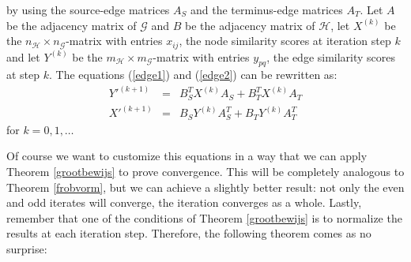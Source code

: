 \documentclass[a4paper,11pt]{report}
\newcommand{\graf}{\mathscr{G}}
\newcommand{\grafeen}{\mathscr{H}}
\begin{document}
by using the source-edge matrices $A_S$ and the terminus-edge matrices $A_T$. Let $A$ be the adjacency matrix of $\graf$ and $B$ be the adjacency
matrix of $\grafeen$, let $X^{(k)}$ be the $n_\grafeen \times n_\graf$-matrix with entries $x_{ij}$, the node similarity scores at iteration step $k$ 
and let $Y^{(k)}$ be the $m_\grafeen \times m_\graf$-matrix with entries $y_{pq}$, the edge similarity scores at step $k$. The equations (\ref{edge1}) and (\ref{edge2}) 
can be rewritten as:
\begin{eqnarray}
  Y'^{(k+1)} &=& B_S^TX^{(k)}A_S + B_T^TX^{(k)}A_T\label{edgematrix1}\\
   X'^{(k+1)} &=& B_SY^{(k)}A_S^T + B_TY^{(k)}A^T_T\label{edgematrix2}
 \end{eqnarray}
 for  $k =  0,1,\ldots$
 
 Of course we want to customize this equations in a way that we can apply Theorem \ref{grootbewijs} to prove convergence. 
 This will be completely analogous to Theorem \ref{frobvorm}, but we can achieve a slightly better result: not only the even and odd iterates
 will converge, the iteration converges as a whole. Lastly, remember that one of the conditions of Theorem \ref{grootbewijs} is to 
 normalize the results at each iteration step. Therefore, the following theorem comes as no surprise:
\end{document}
